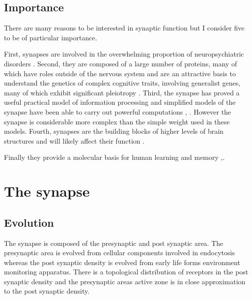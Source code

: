 \subsection{Importance}

There are many reasons to be interested in synaptic function but I consider five to be of particular importance. 

First, synapses are involved in the overwhelming proportion of neuropsychiatric disorders \cite{grant2012synaptopathies}.  Second, they are composed of a large  number of proteins, many of which have roles outside of the nervous system and are an attractive basis to understand the genetics of complex cognitive traits, involving generalist genes, many of which exhibit significant pleiotropy \cite{sharma2000induction}\cite{plomin2015genetics}. Third, the synapse has proved a useful practical model of information processing and simplified models of the synapse have been able to carry out powerful computations \cite{hinton2007learning}, \cite{dean2012three}. However the synapse is considerable more complex than the simple weight used in these models. Fourth, synapses are the building blocks of higher levels of brain structures \cite{armstrong2012evolution} and will likely affect their function \cite{dean2012three}.

Finally they provide a molecular basis for human learning and memory \cite{kandel2014molecular},\cite{gallistel2013neuroscience}.
\section{The synapse}



      



\subsection{Evolution}
The synapse is composed of the presynaptic and post synaptic area. The presynaptic area is evolved from cellular components involved in endocytosis whereas the post synaptic density is evolved from early life forms environment monitoring apparatus. There is a topological distribution of receptors in the post synaptic density and the presynaptic areas active zone is in close approximation to the post synaptic density.  

